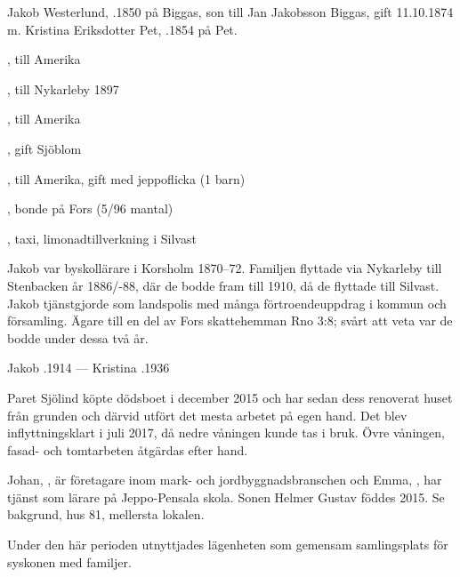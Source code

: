 Jakob Westerlund, .1850 på Biggas, son till Jan Jakobsson Biggas, gift 11.10.1874 m. Kristina Eriksdotter Pet, .1854 på Pet.
\begin{jhchildren}
  \item {}, till Amerika
  \item {}, till Nykarleby 1897
  \item {}, till Amerika
  \item {}, gift Sjöblom
  \item {}, till Amerika, gift med jeppoflicka (1 barn)
  \item {}, bonde på Fors (5/96 mantal)
  \item {}
  \item {}
  \item {}
  \item {}, taxi, limonadtillverkning i Silvast
\end{jhchildren}
Jakob var byskollärare i Korsholm 1870--72. Familjen flyttade via Nykarleby till Stenbacken år 1886/-88, där de bodde fram till 1910, då de flyttade till Silvast. Jakob tjänstgjorde som landspolis med många förtroendeuppdrag i kommun och församling. Ägare till en del av Fors skattehemman Rno 3:8; svårt att veta var de bodde under dessa två år.

Jakob .1914  --- Kristina .1936






Paret Sjölind köpte dödsboet i december 2015 och har sedan dess renoverat huset från grunden och därvid utfört det mesta arbetet på egen hand. Det blev inflyttningsklart i juli 2017, då nedre våningen kunde tas i bruk. Övre våningen, fasad- och tomtarbeten åtgärdas efter hand.

Johan, , är företagare inom mark- och jordbyggnadsbranschen och Emma, , har tjänst som lärare på Jeppo-Pensala skola. Sonen Helmer Gustav föddes 2015. Se bakgrund, hus 81, mellersta lokalen.


Under den här perioden utnyttjades lägenheten som gemensam samlingsplats för syskonen med familjer.\jhvspace{}



